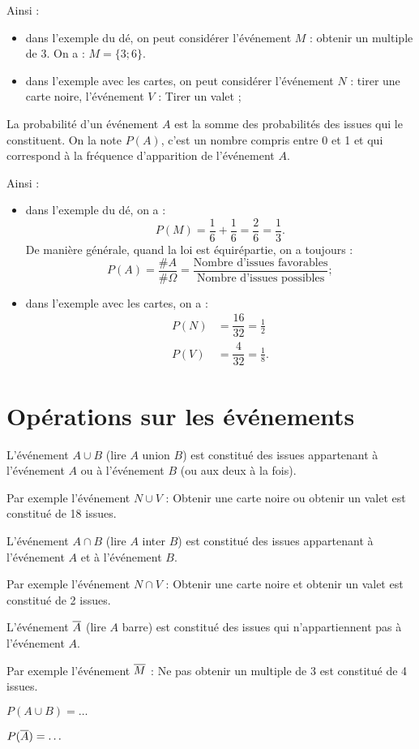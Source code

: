 \documentclass[a4paper,11pt,DIV12,BCOR0mm]{scrartcl}
\begin{document}
Ainsi :
\begin{itemize}
 \item dans l'exemple du dé, on peut considérer l'événement $M$ : \og obtenir un multiple de 3\fg.
  On a : $M=\{3;6\}$.
 \item dans l'exemple avec les cartes, on peut considérer l'événement 
$N$ : \og tirer une carte noire\fg, l'événement $V$ : \og Tirer un valet \fg;
\end{itemize}

\begin{definition}
 La probabilité d'un événement $A$ est la somme des probabilités des issues 
qui le constituent. On la note $P(A)$, c'est un nombre compris entre 0 et 1
et qui correspond à la fréquence d'apparition de l'événement $A$.
\end{definition}

Ainsi :
\begin{itemize}
 \item dans l'exemple du dé, on a :
    \[
     P(M)=\frac16+\frac16=\frac26=\frac13.
    \]
  De manière générale, quand la loi est équirépartie, on a toujours :
    \[
     P(A)=\frac{\#A}{\#\Omega}
	 =\frac{\text{Nombre d'issues favorables}}{\text{Nombre d'issues possibles}};
    \]
 \item dans l'exemple avec les cartes, on a :
    \begin{align*}
     P(N)&=\dfrac{16}{32}=\frac12\\
     P(V)&=\dfrac{4}{32}=\frac18.
    \end{align*}
\end{itemize}

\pagebreak
\section{Opérations sur les événements}
\begin{definition}
 L'événement $A\cup B$ (lire $A$ union $B$) est constitué des issues appartenant à l'événement
$A$ ou à l'événement $B$ (ou aux deux à la fois).
\end{definition}
Par exemple l'événement $N\cup V$ : \og Obtenir une carte noire ou obtenir un valet\fg{}
est constitué de 18 issues.
\begin{definition}
 L'événement $A\cap B$ (lire $A$ inter $B$) est constitué des issues appartenant à l'événement
$A$ et à l'événement $B$.
\end{definition}
Par exemple l'événement $N\cap V$ : \og Obtenir une carte noire et obtenir un valet\fg{}
est constitué de 2 issues. 
\begin{definition}
 L'événement $\overline{A}$ (lire $A$ barre) est constitué des issues qui n'appartiennent
pas à l'événement $A$.
\end{definition}
Par exemple l'événement $\overline{M}$ : \og Ne pas obtenir un multiple de 3\fg{} est 
constitué de 4 issues.


\begin{theoreme}
$P(A\cup B)=\dots$

$P(\overline{A})=\dots$
\end{theoreme}


\end{document}
